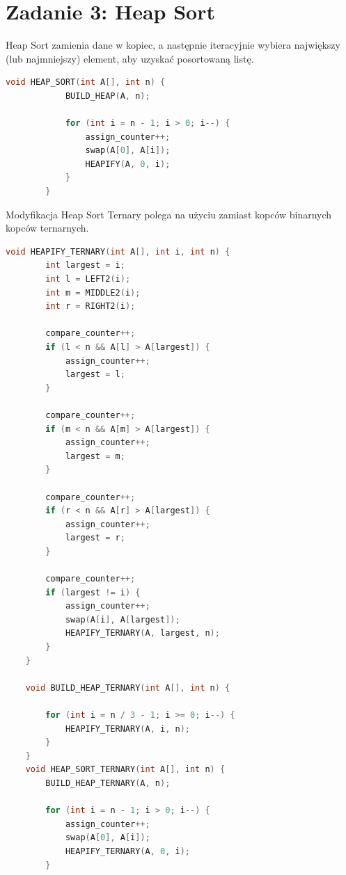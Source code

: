 \documentclass{article}
\theoremstyle{definition}
\begin{document}
\section{Zadanie 3: Heap Sort}
Heap Sort zamienia dane w kopiec, a następnie iteracyjnie wybiera największy (lub najmniejszy) element, aby uzyskać posortowaną listę.
	\begin{lstlisting}[language=C++, caption={Heap Sort}]
		void HEAP_SORT(int A[], int n) {
			BUILD_HEAP(A, n);
			
			for (int i = n - 1; i > 0; i--) {
				assign_counter++;
				swap(A[0], A[i]);
				HEAPIFY(A, 0, i);
			}
		}
	\end{lstlisting}
	Modyfikacja Heap Sort Ternary polega na użyciu zamiast kopców binarnych kopców ternarnych.
	\begin{lstlisting}[language=C++, caption={Heap Sort Ternary}]
	void HEAPIFY_TERNARY(int A[], int i, int n) {
		int largest = i;
		int l = LEFT2(i);
		int m = MIDDLE2(i);
		int r = RIGHT2(i);
		
		compare_counter++;
		if (l < n && A[l] > A[largest]) {
			assign_counter++;
			largest = l;
		}
		
		compare_counter++;
		if (m < n && A[m] > A[largest]) {
			assign_counter++;
			largest = m;
		}
		
		compare_counter++;
		if (r < n && A[r] > A[largest]) {
			assign_counter++;
			largest = r;
		}
		
		compare_counter++;
		if (largest != i) {
			assign_counter++;
			swap(A[i], A[largest]);
			HEAPIFY_TERNARY(A, largest, n);
		}
	}
	
	void BUILD_HEAP_TERNARY(int A[], int n) {
		
		for (int i = n / 3 - 1; i >= 0; i--) {
			HEAPIFY_TERNARY(A, i, n);
		}
	}
	void HEAP_SORT_TERNARY(int A[], int n) {
		BUILD_HEAP_TERNARY(A, n);
		
		for (int i = n - 1; i > 0; i--) {
			assign_counter++;
			swap(A[0], A[i]);
			HEAPIFY_TERNARY(A, 0, i);
		}
	\end{lstlisting}
\end{document}
